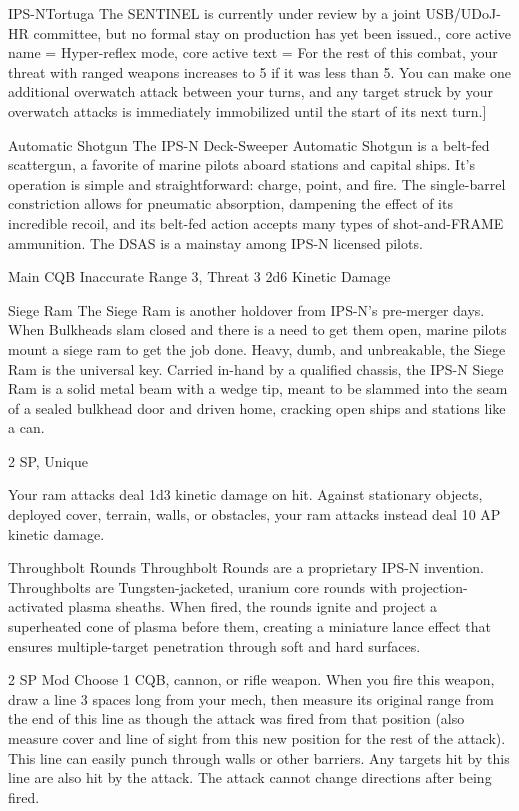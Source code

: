 \begin{mech}{IPS-N}{Tortuga}
{The SENTINEL is currently under review by a joint USB/UDoJ-HR committee, but no formal stay on production has yet been issued.},
core active name = Hyper-reflex mode,
core active text = {For the rest of this combat, your threat with ranged weapons increases to 5 if it was less than 5. You can make one additional overwatch attack between your turns, and any target struck by your overwatch attacks is immediately immobilized until the start of its next turn.}]


Automatic Shotgun
The IPS-N Deck-Sweeper Automatic Shotgun is a belt-fed scattergun, a favorite of marine pilots aboard stations and capital ships. It’s operation is simple and straightforward: charge, point, and fire. The single-barrel constriction allows for pneumatic absorption, dampening the effect of its incredible recoil, and its belt-fed action accepts many types of shot-and-FRAME ammunition. 
The DSAS is a mainstay among IPS-N licensed pilots.   

Main CQB
Inaccurate
Range 3, Threat 3
2d6 Kinetic Damage

Siege Ram
The Siege Ram is another holdover from IPS-N’s pre-merger days. When Bulkheads slam closed and there is a need to get them open, marine pilots mount a siege ram to get the job done. Heavy, dumb, and unbreakable, the Siege Ram is the universal key. Carried in-hand by a qualified chassis, the IPS-N Siege Ram is a solid metal beam with a wedge tip, meant to be slammed into the seam of a sealed bulkhead door and driven home, cracking open ships and stations like a can.  

2 SP, Unique

Your ram attacks deal 1d3 kinetic damage on hit. Against stationary objects, deployed cover, terrain, walls, or obstacles, your ram attacks instead deal 10 AP kinetic damage.

Throughbolt Rounds
Throughbolt Rounds are a proprietary IPS-N invention. Throughbolts are Tungsten-jacketed, uranium core rounds with projection-activated plasma sheaths. When fired, the rounds ignite and project a superheated cone of plasma before them, creating a miniature lance effect that ensures multiple-target penetration through soft and hard surfaces.  

2 SP
Mod
Choose 1 CQB, cannon, or rifle weapon. When you fire this weapon, draw a line 3 spaces long from your mech, then measure its original range from the end of this line as though the attack was fired from that position (also measure cover and line of sight from this new position for the rest of the attack). This line can easily punch through walls or other barriers. Any targets hit by this line are also hit by the attack. The attack cannot change directions after being fired.


\end{mech}

